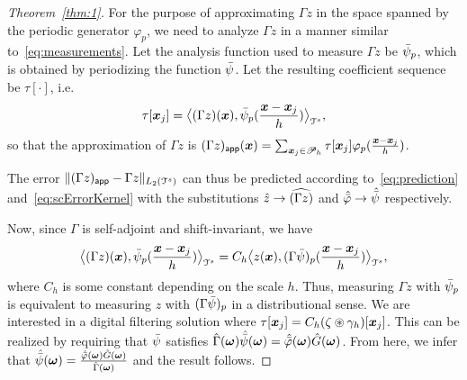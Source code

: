 \begin{proof}[Theorem~\ref{thm:1}]
  For the purpose of approximating $\Gamma z$ in the space spanned by the
  periodic generator $\varphi_p$, we need to analyze $\Gamma z$ in a manner
  similar to~\eqref{eq:measurements}. Let the analysis function used
  to measure $\Gamma z$ be ${\bar{\psi}}_p$, which is obtained by
  periodizing the function ${\bar{\psi}}$. Let the resulting coefficient
  sequence be $\tau[\cdot]$, i.e.
  \begin{equation*}
    \tau[\boldsymbol{x}_j] = 
    \bigl \langle (\Gamma
    z)(\boldsymbol{x}) , {\bar{\psi}}_p(\frac{\boldsymbol{x}-\boldsymbol{x}_j}{h}) \bigr \rangle_{\mathcal{T}^s},
  \end{equation*}
  so that the approximation of $\Gamma z$ is 
  $
  (\Gamma z)_{\mathsf{app}}(\boldsymbol{x}) = \sum_{\boldsymbol{x}_j \in \mathscr{P}_h}
  \tau[\boldsymbol{x}_j] \varphi_p(\frac{\boldsymbol{x}-\boldsymbol{x}_j}{h})
  $.

  The error $\lVert (\Gamma z)_{\mathsf{app}} - \Gamma z \rVert_{L_2(\mathcal{T}^s)}$ can thus be predicted
  according to~\eqref{eq:prediction} and~\eqref{eq:scErrorKernel} with
  the substitutions $\hat{z} \rightarrow \widehat{(\Gamma z)}$ and
  $\hat{{\bar{\varphi}}} \rightarrow \hat{{\bar{\psi}}}$ respectively.

  Now, since $\Gamma$ is self-adjoint and shift-invariant, we have
  \begin{equation*}
    \bigl \langle (\Gamma
    z)(\boldsymbol{x}) , {\bar{\psi}}_p(\frac{\boldsymbol{x}-\boldsymbol{x}_j}{h}) \bigr \rangle_{\mathcal{T}^s} = C_h
    \bigl \langle z(\boldsymbol{x}) , (\Gamma
    {\bar{\psi}})_p(\frac{\boldsymbol{x}-\boldsymbol{x}_j}{h}) \bigr \rangle_{\mathcal{T}^s},
  \end{equation*}
  where $C_h$ is some constant depending on the scale $h$. Thus,
  measuring $\Gamma z$ with ${\bar{\psi}}_p$ is equivalent to measuring
  $z$ with $(\Gamma {\bar{\psi}})_p$ in a distributional sense. We are
  interested in a digital filtering solution where $\tau[\boldsymbol{x}_j] =
  C_h (\zeta \circledast \gamma_h)[\boldsymbol{x}_j]$. This can be realized by requiring
  that ${\bar{\psi}}$ satisfies
  $\hat{\Gamma}(\boldsymbol{\omega})\hat{{\bar{\psi}}}(\boldsymbol{\omega}) =
  \hat{{\bar{\varphi}}}(\boldsymbol{\omega}) \hat{G}(\boldsymbol{\omega})$. From
  here, we infer that $\hat{{\bar{\psi}}}(\boldsymbol{\omega}) =
  \frac{\hat{{\bar{\varphi}}}(\boldsymbol{\omega})\hat{G}(\boldsymbol{\omega})}
  {\hat{\Gamma}(\boldsymbol{\omega})}$ and the result follows.
\end{proof}

